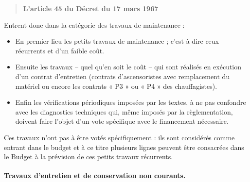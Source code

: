 				\begin{quote}
					\textbf{L’article 45 du Décret du 17 mars 1967}
					
				\end{quote}
				
				Entrent donc dans la catégorie des travaux de maintenance :
				\begin{itemize}
					\item En premier lieu les petits travaux de maintenance ; c’est-à-dire ceux récurrents et d’un faible coût.
					
					\item Ensuite les travaux – quel qu’en soit le coût – qui sont réalisés en exécution d’un contrat d’entretien (contrats d’ascensoristes avec remplacement du matériel ou encore les contrats « P3 » ou « P4 » des chauffagistes).
					
					\item Enfin les vérifications périodiques imposées par les textes, à ne pas confondre avec les diagnostics techniques qui, même imposés par la règlementation, doivent faire l’objet d’un vote spécifique avec le financement nécessaire.
				\end{itemize}
				
				Ces travaux n’ont pas à être votés spécifiquement : ils sont considérés comme entrant dans le budget et à ce titre plusieurs lignes peuvent être consacrées dans le Budget à la prévision de ces petits travaux récurrents.
			
			\paragraph{Travaux d’entretien et de conservation non courants.}
			
